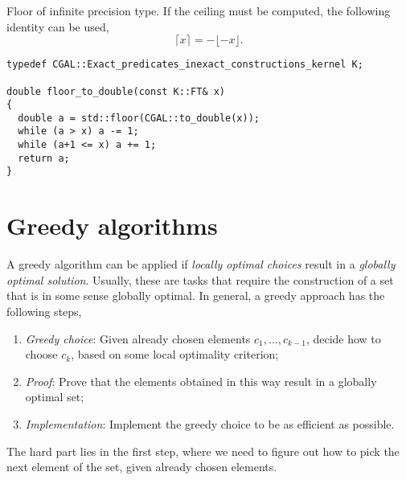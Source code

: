 \documentclass[justified,nobib]{tufte-handout}
\begin{document}
\begin{listing}
    \caption{Floor of infinite precision type. If the ceiling must be computed,
        the following identity can be used, \[ \lceil x \rceil = -\lfloor -x \rfloor .\]}
    \label{lst:floor}
    \begin{lstlisting}
typedef CGAL::Exact_predicates_inexact_constructions_kernel K;

double floor_to_double(const K::FT& x)
{
  double a = std::floor(CGAL::to_double(x));
  while (a > x) a -= 1;
  while (a+1 <= x) a += 1;
  return a;
}
  \end{lstlisting}
\end{listing}

\section{Greedy algorithms}


A greedy algorithm can be applied if \textit{locally optimal choices} result in
a \textit{globally optimal solution}. Usually, these are tasks that require the
construction of a set that is in some sense globally optimal. In general, a
greedy approach has the following steps,
\begin{enumerate}
    \item \textit{Greedy choice}: Given already chosen elements $c_1,\ldots,
              c_{k-1}$, decide how to choose $c_k$, based on some local optimality
          criterion;
    \item \textit{Proof}: Prove that the elements obtained in this way result in
          a globally optimal set;
    \item \textit{Implementation}: Implement the greedy choice to be as efficient
          as possible.
\end{enumerate}
The hard part lies in the first step, where we need to figure out how to pick
the next element of the set, given already chosen elements.
\end{document}
